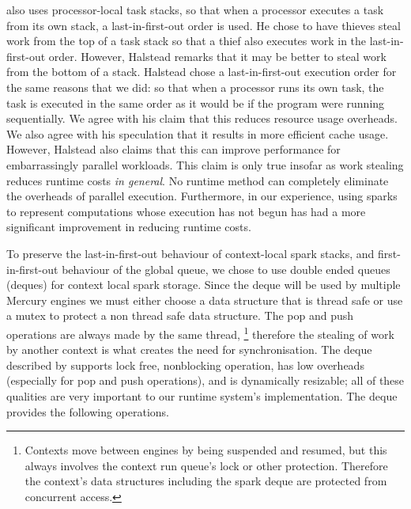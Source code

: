 \citet{halstead:1985:multilisp} also uses processor-local task stacks,
so that when a processor executes a task from its own stack,
a last-in-first-out order is used.
He chose to have thieves steal work from the top of a task stack so
that a thief also executes work in the last-in-first-out order.
However, Halstead remarks that it may be better to steal work from the
bottom of a stack.
Halstead chose a last-in-first-out execution order for the same reasons
that we did:
so that when a processor runs its own task,
the task is executed in the same order as it would be if the program were
running sequentially.
We agree with his claim that this reduces resource usage overheads.
We also agree with his speculation that it results in more efficient cache
usage.
However,
Halstead also claims that this can improve performance for
embarrassingly parallel workloads.
This claim is only true insofar as work stealing reduces runtime costs
\emph{in general}.
No runtime method can completely eliminate the overheads of parallel
execution.
Furthermore, in our experience,
using sparks to represent computations whose execution has
not begun has had a more significant improvement in reducing runtime costs.

To preserve the last-in-first-out behaviour of context-local spark
stacks,
and first-in-first-out behaviour of the global queue,
we chose to use double ended queues (deques) for context local spark
storage.
Since the deque will be used by multiple Mercury engines we must either
choose a data structure that is thread safe or use a mutex to protect a non
thread safe data structure.
The pop and push operations are always made by the same thread,%
\footnote{
    Contexts move between engines by being suspended and resumed,
    but this always involves the context run queue's lock or other
    protection.
    Therefore the context's data structures including the
    spark deque are protected from concurrent access.}
therefore the stealing of work by another context is what creates the need
for synchronisation.
The deque described by \citet{Chase_2005_wsdeque} supports lock free,
nonblocking
operation, has low overheads (especially for pop and push operations),
and is dynamically resizable;
all of these qualities are very important to our runtime system's
implementation.
The deque provides the following operations.

